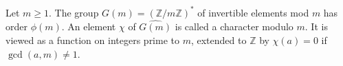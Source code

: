 Let $m \geq 1$. The group $G(m) = (\mathbb{Z}/m\mathbb{Z})^*$ of invertible elements mod $m$ has order $\phi(m)$. An element $\chi$ of $\widehat{G(m)}$ is called a character modulo $m$. It is viewed as a function on integers prime to $m$, extended to $\mathbb{Z}$ by $\chi(a) = 0$ if $\gcd(a,m) \neq 1$.

